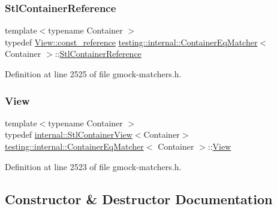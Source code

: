 \subsubsection{\texorpdfstring{Stl\+Container\+Reference}{StlContainerReference}}
{\footnotesize\ttfamily template$<$typename Container $>$ \\
typedef \hyperlink{classtesting_1_1internal_1_1StlContainerView_a9cd4f6ed689b3938cdb7b3c4cbf1b36b}{View\+::const\+\_\+reference} \hyperlink{classtesting_1_1internal_1_1ContainerEqMatcher}{testing\+::internal\+::\+Container\+Eq\+Matcher}$<$ Container $>$\+::\hyperlink{classtesting_1_1internal_1_1ContainerEqMatcher_aaaeaacf0c557fe701a83e108d47edb23}{Stl\+Container\+Reference}}



Definition at line 2525 of file gmock-\/matchers.\+h.

\mbox{\label{classtesting_1_1internal_1_1ContainerEqMatcher_a1565779cdc3d617fcdc8293f9b53c2a6}} 
\subsubsection{\texorpdfstring{View}{View}}
{\footnotesize\ttfamily template$<$typename Container $>$ \\
typedef \hyperlink{classtesting_1_1internal_1_1StlContainerView}{internal\+::\+Stl\+Container\+View}$<$Container$>$ \hyperlink{classtesting_1_1internal_1_1ContainerEqMatcher}{testing\+::internal\+::\+Container\+Eq\+Matcher}$<$ Container $>$\+::\hyperlink{classtesting_1_1internal_1_1ContainerEqMatcher_a1565779cdc3d617fcdc8293f9b53c2a6}{View}}



Definition at line 2523 of file gmock-\/matchers.\+h.



\subsection{Constructor \& Destructor Documentation}
\mbox{\label{classtesting_1_1internal_1_1ContainerEqMatcher_ad9a4c224c92176d57a865191f419802f}} 
